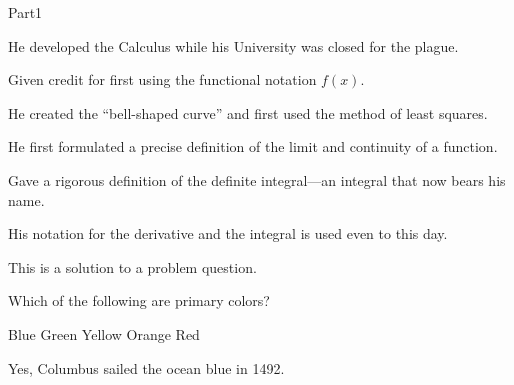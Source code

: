 \documentclass[12pt]{article}
\begin{document}
\begin{exam}[Part I.]{Part1}
\begin{problem}[5]


\begin{answers}{1} %
\bChoices
     He developed the Calculus while his University was closed
          for the plague.\eAns %

     Given credit for first using the functional notation
          $f(x)$.\eAns %

     He created the ``bell-shaped curve'' and first used the
          method of least squares.\eAns  %

     He first formulated a precise definition of the limit
          and continuity of a function.\eAns  %

     Gave a rigorous definition of the definite integral---an
          integral that now bears his name.\eAns  %

     His notation for the derivative and the integral is used
         even to this day.\eAns %
\eChoices

\end{answers}


\begin{solution}
This is a solution to a problem question.
\end{solution}

\end{problem}

\begin{problem}[5]
Which of the following are primary colors?
    \begin{manswers}{6} %
        \bChoices
             Blue\eAns
             Green\eAns
             Yellow\eAns
             Orange\eAns
             Red\eAns
        \eChoices
    \end{manswers}
\begin{solution}
    Yes, Columbus sailed the ocean blue in 1492.
\end{solution}
\end{problem}


\end{exam}
\end{document}
